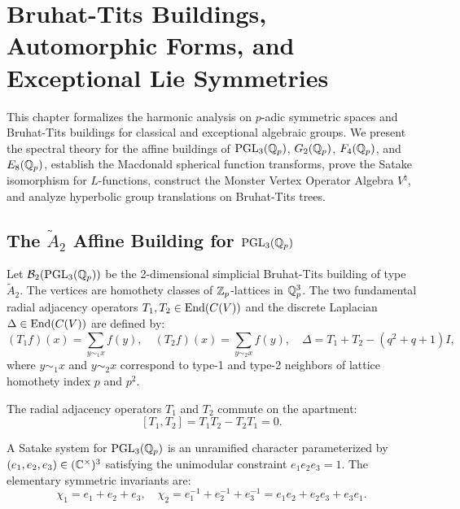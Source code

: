 \chapter{Bruhat-Tits Buildings, Automorphic Forms, and Exceptional Lie Symmetries}
\label{chap:buildings}

This chapter formalizes the harmonic analysis on $p$-adic symmetric spaces and Bruhat-Tits buildings for classical and exceptional algebraic groups. We present the spectral theory for the affine buildings of $\mathrm{PGL}_3(\mathbb{Q}_p)$, $G_2(\mathbb{Q}_p)$, $F_4(\mathbb{Q}_p)$, and $E_8(\mathbb{Q}_p)$, establish the Macdonald spherical function transforms, prove the Satake isomorphism for $L$-functions, construct the Monster Vertex Operator Algebra $V^\natural$, and analyze hyperbolic group translations on Bruhat-Tits trees.

\section{The $\widetilde{A}_2$ Affine Building for $\mathrm{PGL}_3(\mathbb{Q}_p)$}

\begin{definition}
\label{def:building_pgl3}
\leanok
Let $\mathcal{B}_2(\mathrm{PGL}_3(\mathbb{Q}_p))$ be the 2-dimensional simplicial Bruhat-Tits building of type $\widetilde{A}_2$. The vertices are homothety classes of $\mathbb{Z}_p$-lattices in $\mathbb{Q}_p^3$. The two fundamental radial adjacency operators $T_1, T_2 \in \mathrm{End}(C(V))$ and the discrete Laplacian $\Delta \in \mathrm{End}(C(V))$ are defined by:
\[
(T_1 f)(x) = \sum_{y \sim_1 x} f(y), \quad (T_2 f)(x) = \sum_{y \sim_2 x} f(y), \quad \Delta = T_1 + T_2 - (q^2 + q + 1) I,
\]
where $y \sim_1 x$ and $y \sim_2 x$ correspond to type-1 and type-2 neighbors of lattice homothety index $p$ and $p^2$.
\end{definition}

\begin{theorem}
\label{thm:building_pgl3_commute}
\leanok
The radial adjacency operators $T_1$ and $T_2$ commute on the apartment:
\[
[T_1, T_2] = T_1 T_2 - T_2 T_1 = 0.
\]
\end{theorem}

\begin{definition}
\label{def:satake_pgl3}
\leanok
A Satake system for $\mathrm{PGL}_3(\mathbb{Q}_p)$ is an unramified character parameterized by $(e_1, e_2, e_3) \in (\mathbb{C}^\times)^3$ satisfying the unimodular constraint $e_1 e_2 e_3 = 1$. The elementary symmetric invariants are:
\[
\chi_1 = e_1 + e_2 + e_3, \quad \chi_2 = e_1^{-1} + e_2^{-1} + e_3^{-1} = e_1 e_2 + e_2 e_3 + e_3 e_1.
\]
\end{definition}

